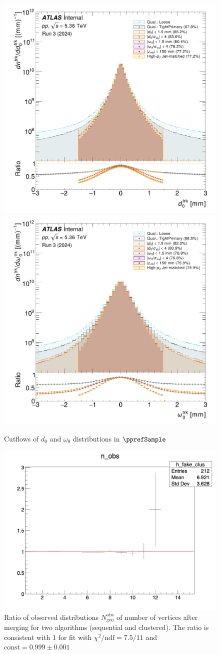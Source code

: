 \begin{figure}[h]
    \centering
    \includegraphics[width=0.49\linewidth]{images/trk_d0_cutflow_.png}
    \includegraphics[width=0.49\linewidth]{images/trk_omega0_cutflow_.png}
    \caption{Cutflows of $d_0$ and $\omega_0$ distributions in $\pprefSample$}
    \label{fig:cutflow_d0_omega0}
\end{figure}

\begin{figure}[h]
    \centering
    \includegraphics[width=0.5\linewidth]{images/comp_clus_seq_merger.png}
    \caption{Ratio of observed distributions $N_\text{gen}^\text{obs}$ of number of vertices after merging for two algorithms (sequential and clustered). The ratio is consistent with 1 for fit with $\chi^2/\text{ndf}=7.5/11$ and $\text{const}=0.999 \pm0.001$}
    \label{fig:ratio_seq_clus_merger}
\end{figure}